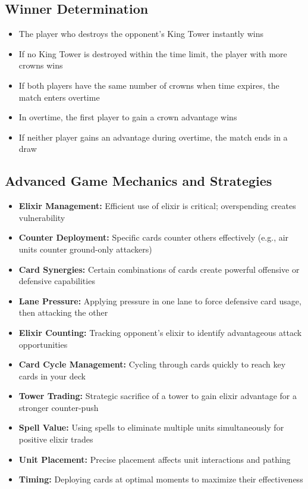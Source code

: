 \documentclass{article}
\begin{document}
\subsection{Winner Determination}
\begin{itemize}
    \item The player who destroys the opponent's King Tower instantly wins
    \item If no King Tower is destroyed within the time limit, the player with more crowns wins
    \item If both players have the same number of crowns when time expires, the match enters overtime
    \item In overtime, the first player to gain a crown advantage wins
    \item If neither player gains an advantage during overtime, the match ends in a draw
\end{itemize}

\subsection{Advanced Game Mechanics and Strategies}
\begin{itemize}
    \item \textbf{Elixir Management:} Efficient use of elixir is critical; overspending creates vulnerability
    \item \textbf{Counter Deployment:} Specific cards counter others effectively (e.g., air units counter ground-only attackers)
    \item \textbf{Card Synergies:} Certain combinations of cards create powerful offensive or defensive capabilities
    \item \textbf{Lane Pressure:} Applying pressure in one lane to force defensive card usage, then attacking the other
    \item \textbf{Elixir Counting:} Tracking opponent's elixir to identify advantageous attack opportunities
    \item \textbf{Card Cycle Management:} Cycling through cards quickly to reach key cards in your deck
    \item \textbf{Tower Trading:} Strategic sacrifice of a tower to gain elixir advantage for a stronger counter-push
    \item \textbf{Spell Value:} Using spells to eliminate multiple units simultaneously for positive elixir trades
    \item \textbf{Unit Placement:} Precise placement affects unit interactions and pathing
    \item \textbf{Timing:} Deploying cards at optimal moments to maximize their effectiveness
\end{itemize}
\end{document}
